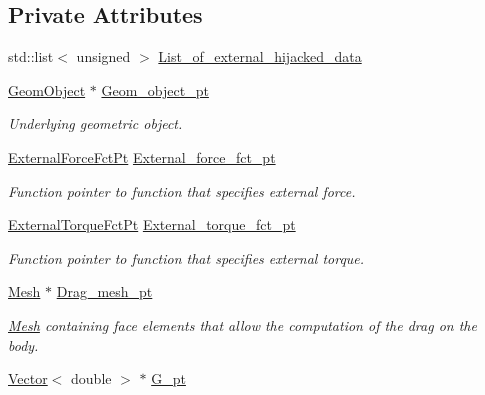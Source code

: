 \subsection*{Private Attributes}
\begin{DoxyCompactItemize}
\item 
std\+::list$<$ unsigned $>$ \hyperlink{classoomph_1_1ImmersedRigidBodyElement_afb7caf6fb7b409f32b948de6ef6fc8c4}{List\+\_\+of\+\_\+external\+\_\+hijacked\+\_\+data}
\item 
\hyperlink{classoomph_1_1GeomObject}{Geom\+Object} $\ast$ \hyperlink{classoomph_1_1ImmersedRigidBodyElement_aa522d91f432b5da330042ee34735fab2}{Geom\+\_\+object\+\_\+pt}
\begin{DoxyCompactList}\small\item\em Underlying geometric object. \end{DoxyCompactList}\item 
\hyperlink{classoomph_1_1ImmersedRigidBodyElement_a7a43bfd54213becfb135b594720b0539}{External\+Force\+Fct\+Pt} \hyperlink{classoomph_1_1ImmersedRigidBodyElement_aac35cbe02cabee08a706aadd03af801a}{External\+\_\+force\+\_\+fct\+\_\+pt}
\begin{DoxyCompactList}\small\item\em Function pointer to function that specifies external force. \end{DoxyCompactList}\item 
\hyperlink{classoomph_1_1ImmersedRigidBodyElement_a455638a1d0e9547290d835513d00c40e}{External\+Torque\+Fct\+Pt} \hyperlink{classoomph_1_1ImmersedRigidBodyElement_a4061f0ed0ea1ca3a8d0b618664ce889a}{External\+\_\+torque\+\_\+fct\+\_\+pt}
\begin{DoxyCompactList}\small\item\em Function pointer to function that specifies external torque. \end{DoxyCompactList}\item 
\hyperlink{classoomph_1_1Mesh}{Mesh} $\ast$ \hyperlink{classoomph_1_1ImmersedRigidBodyElement_ae34b3efd4b3bd9619d9abc371bf7de14}{Drag\+\_\+mesh\+\_\+pt}
\begin{DoxyCompactList}\small\item\em \hyperlink{classoomph_1_1Mesh}{Mesh} containing face elements that allow the computation of the drag on the body. \end{DoxyCompactList}\item 
\hyperlink{classoomph_1_1Vector}{Vector}$<$ double $>$ $\ast$ \hyperlink{classoomph_1_1ImmersedRigidBodyElement_ad8c6a50f2055f33942e011661a8b4499}{G\+\_\+pt}

\end{DoxyCompactItemize}
